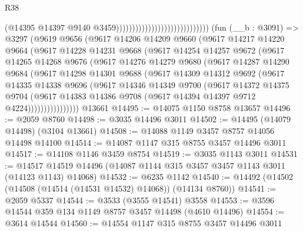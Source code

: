 \begin{lexlean}{R38}
\begin{coremodule}
                                                            (@14395
                                                              @14397
                                                              @9140
                                                              @3459)))))))))))))))))))))))))))))
    (fun (__b : @3091) =>
    @3297
      (@9619
        @9656
        (@9617
          @14206
          @14209
          @9660
          (@9617
            @14217
            @14220
            @9664
            (@9617
              @14228
              @14231
              @9668
              (@9617
                @14254
                @14257
                @9672
                (@9617
                  @14265
                  @14268
                  @9676
                  (@9617
                    @14276
                    @14279
                    @9680
                    (@9617
                      @14287
                      @14290
                      @9684
                      (@9617
                        @14298
                        @14301
                        @9688
                        (@9617
                          @14309
                          @14312
                          @9692
                          (@9617
                            @14335
                            @14338
                            @9696
                            (@9617
                              @14346
                              @14349
                              @9700
                              (@9617
                                @14372
                                @14375
                                @9704
                                (@9617
                                  @14383
                                  @14386
                                  @9708
                                  (@9617 @14394 @14397 @9712 @4224))))))))))))))))
    @13661
@14495 := @14075 @1150 @8758 @13657
@14496 := @2059 @8760
@14498 := @3035 @14496 @3011
@14502 := @14495 (@14079 @14498) (@3104 @13661)
@14508 := @14088 @1149 @3457 @8757 @14056 @14498 @14100
@14514 := @14087 @1147 @315 @8755 @3457 @14496 @3011
@14517 := @14108 @1146 @3459 @8754
@14519 := @3035 @1143 @3011
@14531 := @14517 @14519 @14496 (@14087 @1144 @315 @3457 @3457 @1143 @3011 (@14123 @1143) @14068)
@14532 := @6235 @1142
@14540 := @14492 (@14502 (@14508 (@14514 (@14531 @14532) @14068)) (@14134 @8760))
@14541 := @2059 @5337
@14544 := @3533 (@3555 @14541) @3558
@14553 := @3596 @14544 @359 @134 @1149 @8757 @3457 @14498 (@4610 @14496)
@14554 := @3614 @14544
@14560 := @14554 @1147 @315 @8755 @3457 @14496 @3011

\end{coremodule}
\end{lexlean}
